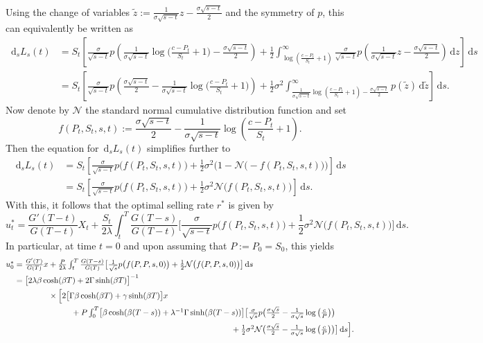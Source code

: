 \documentclass[openany,oneside]{article}
\theoremstyle{definition}
\theoremstyle{remark}
\newcommand{\ts}{\textstyle}
\newcommand{\de}{\,\mathrm{d}}
\begin{document}
{\color{blue}Using the change of variables $\tilde z := \frac{1}{\sigma\sqrt{s-t}}z-\frac{\sigma\sqrt{s-t}}{2}$ and the symmetry of $p$, this can equivalently be written as
\begin{align*}
 \ts \de_s L_s(t) &\ts= S_t\left[ \frac{\sigma}{\sqrt{s-t}}p\left(\frac{1}{\sigma\sqrt{s-t}}\log\bigl(\frac{c-P_t}{S_t}+1\bigr)-\frac{\sigma\sqrt{s-t}}{2} \right)+\frac{1}{2}\int_{\log\left(\frac{c-P_t}{S_t}+1\right)}^\infty \frac{\sigma}{\sqrt{s-t}}p\left(\frac{1}{\sigma\sqrt{s-t}}z-\frac{\sigma\sqrt{s-t}}{2}\right)\de z \right] \de s\\
  &\ts = S_t\left[ \frac{\sigma}{\sqrt{s-t}}p\left(\frac{\sigma\sqrt{s-t}}{2}-\frac{1}{\sigma\sqrt{s-t}}\log\bigl(\frac{c-P_t}{S_t}+1\bigr) \right)+\frac{1}{2}\sigma^2 \int_{\frac{1}{\sigma\sqrt{s-t}}\log\left(\frac{c-P_t}{S_t}+1\right) - \frac{\sigma\sqrt{s-t}}{2}}^\infty p(\tilde z)\de\tilde z \right] \de s.
\end{align*}
Now denote by $\mathcal N$ the standard normal cumulative distribution function and set
\[
 \ts f(P_t,S_t,s,t) := \frac{\sigma\sqrt{s-t}}{2} - \frac{1}{\sigma\sqrt{s-t}}\log\left(\frac{c-P_t}{S_t}+1\right).
\]
Then the equation for $\de_s L_s(t)$ simplifies further to
\begin{align*}
 \ts \de_s L_s(t) &\ts= S_t\left[ \frac{\sigma}{\sqrt{s-t}}p\bigl(f(P_t,S_t,s,t)\bigr)+\frac{1}{2}\sigma^2 \bigl(1 - \mathcal N\bigl(-f(P_t,S_t,s,t)\bigr)\bigr)\right] \de s\\
  &\ts= S_t\left[ \frac{\sigma}{\sqrt{s-t}}p\bigl(f(P_t,S_t,s,t)\bigr)+\frac{1}{2}\sigma^2 \mathcal N\bigl(f(P_t,S_t,s,t)\bigr)\right] \de s.
\end{align*}
With this, it follows that the optimal selling rate $r^*$ is given by
\[
 \ts u_t^* = \frac{G'(T-t)}{G(T-t)} X_t + \frac{S_t}{2\lambda}\int_t^T  \frac{G(T-s)}{G(T-t)} \bigl[ \frac{\sigma}{\sqrt{s-t}}p\bigl(f(P_t,S_t,s,t)\bigr)+\frac{1}{2}\sigma^2 \mathcal N\bigl(f(P_t,S_t,s,t)\bigr)\bigr] \de s.
\]
In particular, at time $t=0$ and upon assuming that $P:=P_0=S_0$, this yields
\begin{align*}
 \ts u_0^* &\ts= \frac{G'(T)}{G(T)} x + \frac{P}{2\lambda}\int_t^T  \frac{G(T-s)}{G(T)} \bigl[ \frac{1}{\sqrt{s}}p\bigl(f(P,P,s,0)\bigr)+\frac{1}{2}\mathcal N\bigl(f(P,P,s,0)\bigr)\bigr] \de s\\
           &\ts= \bigl[2\lambda\beta\cosh(\beta T)+2\Gamma\sinh(\beta T)\bigr]^{-1}\\
					 &\ts\hspace{1.5cm}\times\Bigl[ 2\bigl[\Gamma\beta\cosh(\beta T)+\gamma\sinh(\beta T)\bigr] x\\
					 &\ts\hspace{2.5cm}+ P\int_0^T  \bigl[\beta\cosh(\beta (T-s))+\lambda^{-1}\Gamma\sinh(\beta (T-s))\bigr] \bigl[ \frac{\sigma}{\sqrt{s}}p\bigl(\frac{\sigma\sqrt{s}}{2} - \frac{1}{\sigma\sqrt{s}}\log\left(\frac{c}{P}\right)\bigr)\\
					 &\ts\hspace{9.5cm}+\frac{1}{2}\sigma^2 \mathcal N\bigl(\frac{\sigma\sqrt{s}}{2} - \frac{1}{\sigma\sqrt{s}}\log\left(\frac{c}{P}\right)\bigr)\bigr] \de s\Bigr].
\end{align*}
}
\end{document}
